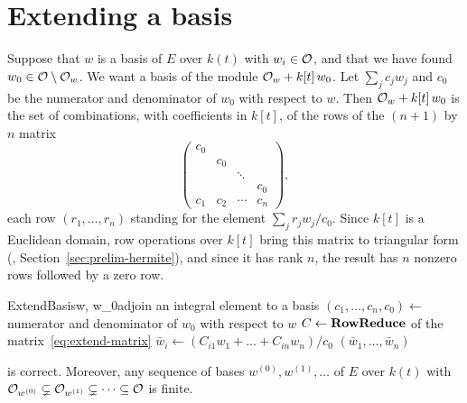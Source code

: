 \section{Extending a basis}\label{sec:hermite-extend}

Suppose that $w$ is a basis of $E$ over $k(t)$ with $w_i \in \mathcal{O}$, and that
we have found $w_0 \in \mathcal{O} \setminus \mathcal{O}_w$. We want a basis of the module
$\mathcal{O}_w + k[t]\, w_0$. Let $\sum_j c_j w_j$ and $c_0$ be the numerator and
denominator of $w_0$ with respect to $w$. Then $\mathcal{O}_w + k[t]\, w_0$ is the set
of combinations, with coefficients in $k[t]$, of the rows of the $(n + 1)$ by
$n$ matrix
\begin{equation}\label{eq:extend-matrix}
  \begin{pmatrix}
    c_0   &     &        &     \\
        & c_0   &        &     \\
        &     & \ddots &     \\
        &     &        & c_0   \\
    c_1 & c_2 & \cdots & c_n
  \end{pmatrix},
\end{equation}
each row $(r_1, \dots, r_n)$ standing for the element $\sum_j r_j w_j / c_0$.
Since $k[t]$ is a Euclidean domain, row operations over $k[t]$ bring this
matrix to triangular form (,
Section~\ref{sec:prelim-hermite}), and since it
has rank $n$, the result has $n$ nonzero rows followed by a zero row.

\begin{algo}{ExtendBasis}{w, w_0}{adjoin an integral element to a basis}
\State $(c_1, \dots, c_n, c_0) \gets$ numerator and denominator of $w_0$ with respect to $w$
\State $C \gets \textbf{RowReduce}$ of the matrix~\eqref{eq:extend-matrix} 
  \State $\bar w_i \gets (C_{i1} w_1 + \dots + C_{in} w_n) / c_0$
\EndFor
\State \Return $(\bar w_1, \dots, \bar w_n)$
\end{algo}

\begin{lemma}\label{lem:extend}
 is correct. Moreover, any sequence of bases $w^{(0)},
w^{(1)}, \dots$ of $E$ over $k(t)$ with $\mathcal{O}_{w^{(0)}} \subsetneq
\mathcal{O}_{w^{(1)}} \subsetneq \dots \subseteq \mathcal{O}$ is finite.
\end{lemma}

